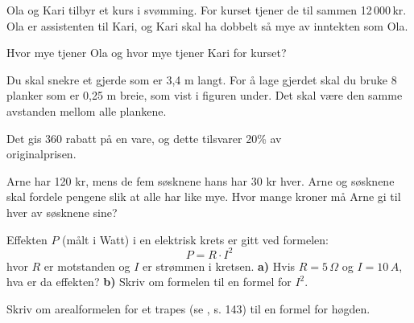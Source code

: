 



\opgt

Ola og Kari tilbyr et kurs i svømming. For kurset tjener de til sammen 12\,000\,kr. Ola er assistenten til Kari, og Kari skal ha dobbelt så mye av inntekten som Ola. \os

Hvor mye tjener Ola og hvor mye tjener Kari for kurset?

Du skal snekre et gjerde som er 3,4 m langt. For å lage gjerdet skal du bruke 8 planker som er 0,25 m breie, som vist i figuren under. Det skal være den samme avstanden mellom alle plankene. 

 \vs
{}

 \vs
{}
\newpage
{}
Det gis 360 rabatt på en vare, og dette tilsvarer 20\% av \\ originalprisen.



\newpage


Arne har 120 kr, mens de fem søsknene hans har 30 kr hver. Arne og søsknene skal fordele pengene slik at alle har like mye. Hvor mange kroner må Arne gi til hver av søsknene sine?

Effekten $ P $ (målt i Watt) i en elektrisk krets er gitt ved formelen:
\[ P=R\cdot I^2 \]
hvor $ R $ er motstanden og $ I $ er strømmen i kretsen.\os
\textbf{a)} Hvis $ {R=5\,\Omega} $ og $ {I=10\,A} $, hva er da effekten?\os
\textbf{b)} Skriv om formelen til en formel for $ I^2 $.

Skriv om arealformelen for et trapes (se \mb, s. 143) til en formel for høgden.

